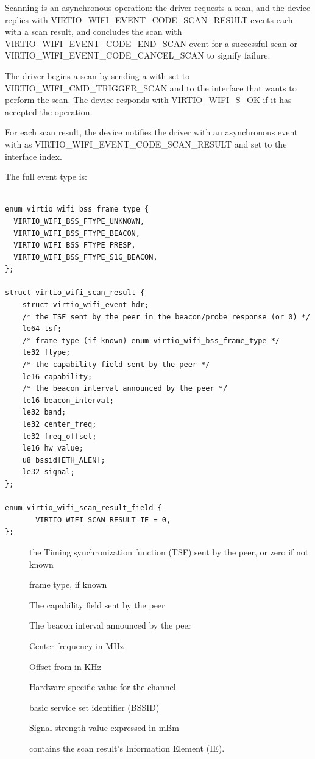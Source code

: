 Scanning is an asynchronous operation: the driver requests a scan, and the device replies with VIRTIO_WIFI_EVENT_CODE_SCAN_RESULT events each with a scan result, and concludes the scan with VIRTIO_WIFI_EVENT_CODE_END_SCAN event for a successful scan or VIRTIO_WIFI_EVENT_CODE_CANCEL_SCAN to signify failure.

The driver begins a scan by sending a  with  set to  VIRTIO_WIFI_CMD_TRIGGER_SCAN and  to the interface that wants to perform the scan. The device responds with VIRTIO_WIFI_S_OK if it has accepted the operation.

For each scan result, the device notifies the driver with an asynchronous event with  as VIRTIO_WIFI_EVENT_CODE_SCAN_RESULT and  set to the interface index.

The full event type is:


\begin{lstlisting}

enum virtio_wifi_bss_frame_type {
  VIRTIO_WIFI_BSS_FTYPE_UNKNOWN,
  VIRTIO_WIFI_BSS_FTYPE_BEACON,
  VIRTIO_WIFI_BSS_FTYPE_PRESP,
  VIRTIO_WIFI_BSS_FTYPE_S1G_BEACON,
};

struct virtio_wifi_scan_result {
	struct virtio_wifi_event hdr;
	/* the TSF sent by the peer in the beacon/probe response (or 0) */
	le64 tsf;
	/* frame type (if known) enum virtio_wifi_bss_frame_type */
	le32 ftype;
	/* the capability field sent by the peer */
	le16 capability;
	/* the beacon interval announced by the peer */
	le16 beacon_interval;
	le32 band;
	le32 center_freq;
	le32 freq_offset;
	le16 hw_value;
	u8 bssid[ETH_ALEN];
	le32 signal;
};

enum virtio_wifi_scan_result_field {
       VIRTIO_WIFI_SCAN_RESULT_IE = 0,
};
\end{lstlisting}

\begin{description}
\item[] the Timing synchronization function (TSF) sent by the peer, or zero if not known
\item[] frame type, if known
\item[] The capability field sent by the peer
\item[] The beacon interval announced by the peer
\item[] %
\item[] Center frequency in MHz
\item[] Offset from  in KHz
\item[] Hardware-specific value for the channel
\item[] basic service set identifier (BSSID)
\item[] Signal strength value expressed in mBm
\item[] contains the scan result's Information Element (IE).
\end{description}

